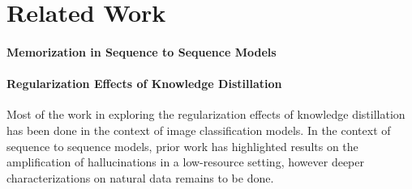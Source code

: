 \section{Related Work}
\paragraph{Memorization in Sequence to Sequence Models} 

\paragraph{Regularization Effects of Knowledge Distillation} Most of the work in exploring the regularization effects of knowledge distillation has been done in the context of image classification models. In the context of sequence to sequence models, prior work has highlighted results on the amplification of hallucinations in a low-resource setting, however deeper characterizations on natural data remains to be done.